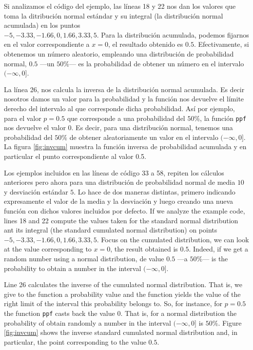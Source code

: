 \begin{paracol}{2}
Si analizamos el código del ejemplo, las líneas 18 y 22 nos dan los valores que toma la ditribución normal estándar y su integral (la distribución normal acumulada) en los puntos\\ $-5,-3.33,-1.66,0,1.66,3.33,5$.
Para la distribución acumulada, podemos fijarnos en el valor correspondiente a $x=0$, el resultado obtenido es $0.5$. Efectivamente, si obtenemos un número aleatorio, empleando una distribución de probabilidad normal, $0.5$ ---un $50\%$--- es la probabilidad de obtener un número en el intervalo $(-\infty, 0]$.  

La línea 26, nos calcula la inversa de la distribución normal acumulada. Es decir nosotros damos un valor para la probabilidad y la función nos devuelve el límite derecho del intervalo al que corresponde dicha probabilidad. Así por ejemplo, para el valor $p=0.5$ que corresponde a una probabilidad del $50\%$, la función \texttt{ppf} nos devuelve el valor $0$. Es decir, para una distribución normal, tenemos una probabilidad del $50\%$ de obtener aleatoriamente un valor en el intervalo $(-\infty, 0]$. La figura \ref{fig:invcum} muestra la función inversa de probabilidad acumulada y en particular el punto  correspondiente al valor 0.5.


Los ejemplos incluidos en las líneas de código 33 a 58, repiten los cálculos anteriores pero ahora para una distribución de probabilidad normal de media $10$ y desviación estándar $5$. Lo hace de dos maneras distintas, primero indicando expresamente el valor de la media y la desviación y luego creando una nueva función con dichos valores incluidos por defecto. 
\switchcolumn
If we analyze the example code, lines 18 and 22 compute the values taken for the standard normal distribution ant its integral (the standard cumulated normal distribution) on points $-5,-3.33,-1.66,0,1.66,3.33,5$. Focus on the cumulated distribution, we can look at the value corresponding to $x=0$, the result obtained is $0.5$. Indeed, if we get a random number using a normal distribution, de value $0.5$ ---a $50\%$--- is the probability to obtain a number in the interval $(-\infty, 0]$.

Line 26 calculates the inverse of the cumulated normal distribution. That is, we give to the function a probability value and the function yields the value of the right limit of the interval this probability belongs to. So, for instance, for $p=0.5$ the function \texttt{ppf} casts back the value $0$. That is, for a normal distribution the probability of obtain randomly a number in the interval $(-\infty, 0]$ is $50\%$. Figure \ref{fig:invcum} shows the inverse standard cumulated normal distribution and, in particular, the point corresponding to the value $0.5$.


\end{paracol}
